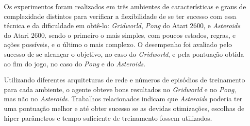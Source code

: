 Os experimentos foram realizados em três ambientes de características e graus de complexidade distintos para verificar a flexibilidade de se ter sucesso com essa técnica e da dificuldade em obtê-lo: \textit{Gridworld}, \textit{Pong} do Atari 2600, e \textit{Asteroids} do Atari 2600, sendo o primeiro o mais simples, com poucos estados, regras, e ações possíveis, e o último o mais complexo.
O desempenho foi avaliado pelo sucesso de se alcançar o objetivo, no caso do \textit{Gridworld}, e pela pontuação obtida ao fim do jogo, no caso do \textit{Pong} e do \textit{Asteroids}.
\smallskip

Utilizando diferentes arquiteturas de rede e números de episódios de treinamento para cada ambiente, o agente obteve bons resultados no \textit{Gridworld} e no \textit{Pong}, mas não no \textit{Asteroids}.
Trabalhos relacionados indicam que \textit{Asteroids} poderia ter uma pontuação melhor e até obter sucesso se as devidas otimizações, escolhas de hiper-parâmetros e tempo suficiente de treinamento fossem utilizados.
\bigskip






